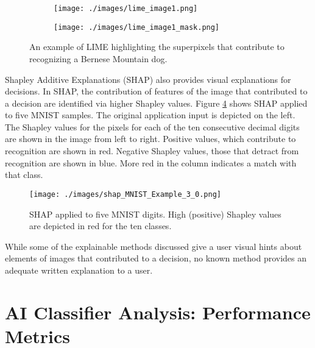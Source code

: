 \begin{figure}[H]
    \centering

    \begin{subfigure}{.40\columnwidth}
        \centering
        \texttt{[image: ./images/lime\_image1.png]}
        \caption{}
        \label{fig:lime_ex1}
    \end{subfigure}%
    \begin{subfigure}{.40\columnwidth}
        \centering
        \texttt{[image: ./images/lime\_image1\_mask.png]}
        \caption{}
        \label{fig:lime_ex1_mask}
    \end{subfigure}%

    \caption{An example of LIME highlighting the superpixels that contribute to recognizing a Bernese Mountain dog\cite{lime_github}.}
    \label{fig:lime_mask}
\end{figure}

Shapley Additive Explanations (SHAP) also provides visual explanations for
decisions. In SHAP, the contribution of features of the image that contributed
to a decision are identified via higher Shapley values. Figure
\ref{fig:shap_mnist} shows SHAP applied to five MNIST samples.  The original
application input is depicted on the left. The Shapley values for the pixels for
each of the ten consecutive decimal digits are shown in the image from left to
right.  Positive values, which contribute to recognition are shown in red.
Negative Shapley values, those that detract from recognition are shown in blue.
More red in the column indicates a match with that
class\cite{lundberg2017unified}.

\begin{figure}[h]
    \texttt{[image: ./images/shap\_MNIST\_Example\_3\_0.png]}
    \caption{SHAP applied to five MNIST digits. High (positive) Shapley values are depicted in red for the ten classes\cite{shap_docs}.}
    \label{fig:shap_mnist}
\end{figure}

While some of the explainable methods discussed give a user visual hints about
elements of images that contributed to a decision, no known method provides an
adequate written explanation to a user.

\section{AI Classifier Analysis: Performance Metrics}
\label{sec:perf_metrics}

